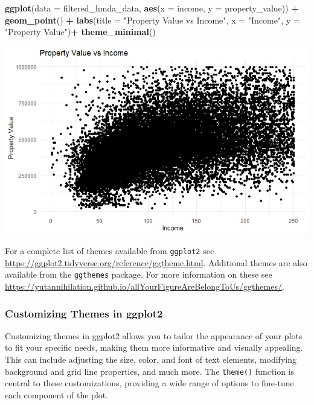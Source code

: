 \documentclass[
]{book}
\newenvironment{Shaded}{\begin{snugshade}}{\end{snugshade}}
\newcommand{\AttributeTok}[1]{\textcolor[rgb]{0.13,0.29,0.53}{#1}}
\newcommand{\FunctionTok}[1]{\textcolor[rgb]{0.13,0.29,0.53}{\textbf{#1}}}
\newcommand{\NormalTok}[1]{#1}
\newcommand{\SpecialCharTok}[1]{\textcolor[rgb]{0.81,0.36,0.00}{\textbf{#1}}}
\newcommand{\StringTok}[1]{\textcolor[rgb]{0.31,0.60,0.02}{#1}}
\begin{document}
\begin{Shaded}
\begin{Highlighting}[]
\FunctionTok{ggplot}\NormalTok{(}\AttributeTok{data =}\NormalTok{ filtered\_hmda\_data, }\FunctionTok{aes}\NormalTok{(}\AttributeTok{x =}\NormalTok{ income, }\AttributeTok{y =}\NormalTok{ property\_value)) }\SpecialCharTok{+}
  \FunctionTok{geom\_point}\NormalTok{() }\SpecialCharTok{+}
  \FunctionTok{labs}\NormalTok{(}\AttributeTok{title =} \StringTok{"Property Value vs Income"}\NormalTok{,}
       \AttributeTok{x =} \StringTok{"Income"}\NormalTok{,}
       \AttributeTok{y =} \StringTok{"Property Value"}\NormalTok{)}\SpecialCharTok{+}
  \FunctionTok{theme\_minimal}\NormalTok{()}
\end{Highlighting}
\end{Shaded}

\includegraphics{images/scatter plot with theme_minimal.PNG}

For a complete list of themes available from \texttt{ggplot2} see \url{https://ggplot2.tidyverse.org/reference/ggtheme.html}. Additional themes are also available from the \texttt{ggthemes} package. For more information on these see \url{https://yutannihilation.github.io/allYourFigureAreBelongToUs/ggthemes/}.

\hypertarget{customizing-themes-in-ggplot2}{%
\subsubsection*{Customizing Themes in ggplot2}\label{customizing-themes-in-ggplot2}}

Customizing themes in ggplot2 allows you to tailor the appearance of your plots to fit your specific needs, making them more informative and visually appealing. This can include adjusting the size, color, and font of text elements, modifying background and grid line properties, and much more. The \texttt{theme()} function is central to these customizations, providing a wide range of options to fine-tune each component of the plot.
\end{document}
